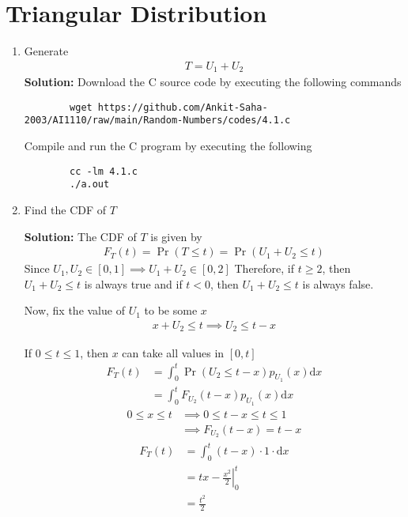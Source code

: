 \documentclass[journal,12pt,twocolumn]{IEEEtran}
\newcommand{\solution}{\noindent \textbf{Solution: }}
\providecommand{\pr}[1]{\ensuremath{\Pr\left(#1\right)}}
\providecommand{\der}[1]{\mathrm{d} #1}
\numberwithin{equation}{section}
\renewcommand\thesection{\arabic{section}}
\begin{document}
	\section{Triangular Distribution}
	\begin{enumerate}[label=\thesection.\arabic*,ref=\thesection.\theenumi]
	\item Generate 
	\begin{align}
		T = U_1+U_2
	\end{align}
	\solution Download the C source code by executing the following commands
	\begin{lstlisting}
		wget https://github.com/Ankit-Saha-2003/AI1110/raw/main/Random-Numbers/codes/4.1.c
	\end{lstlisting}
	Compile and run the C program by executing the following
	\begin{lstlisting}
		cc -lm 4.1.c
		./a.out
	\end{lstlisting}
	
	\item Find the CDF of $T$
	
	\solution The CDF of $T$ is given by
	\begin{align}
		F_T(t) = \pr{T \le t} = \pr{U_1 + U_2 \le t}	
	\end{align}		
	Since $U_1, U_2 \in [0,1] \implies U_1 + U_2 \in [0,2]$
	Therefore, if $t \ge 2$, then $U_1 + U_2 \le t$ is always true and if $t < 0$, then $U_1 + U_2 \le t$ is always false.
	
	Now, fix the value of $U_1$ to be some $x$
	\begin{align}
		x + U_2 \le t \implies U_2 \le t - x
	\end{align}
	
	If $0 \le t \le 1$, then $x$ can take all values in $[0,t]$
	\begin{align}
		F_T(t)	&= \int_0^t \pr{U_2 \le t - x} p_{U_1}(x) \der{x} \\
		&= \int_0^t F_{U_2}(t-x) p_{U_1}(x) \der{x}
	\end{align}
	\begin{align}
		0 \le x \le t &\implies 0 \le t - x \le t \le 1 \\
		&\implies F_{U_2}(t-x) = t - x
	\end{align}
	\begin{align}
		F_T(t) &= \int_0^t (t-x) \cdot 1 \cdot \der{x} \\
		&= \left. tx - \frac{x^2}{2} \right|_0^t \\
		&= \frac{t^2}{2}
	\end{align}
	

\end{enumerate}
\end{document}
